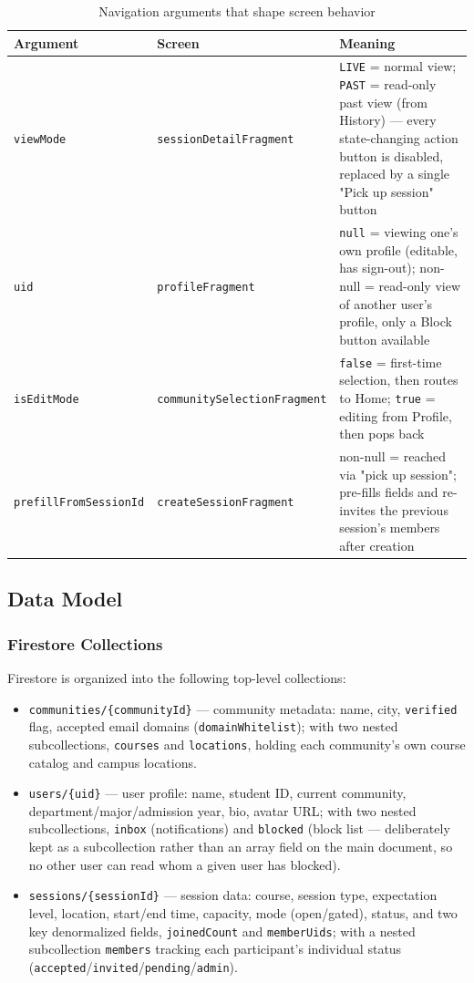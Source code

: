 \begin{table}[h]
\centering
\caption{Navigation arguments that shape screen behavior}
\label{tab:navargs}
\begin{tabular}{p{3.2cm}p{3.2cm}p{7cm}}
\toprule
\textbf{Argument} & \textbf{Screen} & \textbf{Meaning} \\
\midrule
\texttt{viewMode} & \texttt{sessionDetailFragment} & \texttt{LIVE} = normal view; \texttt{PAST} = read-only past view (from History) — every state-changing action button is disabled, replaced by a single "Pick up session" button \\
\texttt{uid} & \texttt{profileFragment} & \texttt{null} = viewing one's own profile (editable, has sign-out); non-null = read-only view of another user's profile, only a Block button available \\
\texttt{isEditMode} & \texttt{communitySelectionFragment} & \texttt{false} = first-time selection, then routes to Home; \texttt{true} = editing from Profile, then pops back \\
\texttt{prefillFromSessionId} & \texttt{createSessionFragment} & non-null = reached via "pick up session"; pre-fills fields and re-invites the previous session's members after creation \\
\bottomrule
\end{tabular}
\end{table}

\subsection{Data Model}
\label{sec:datamodel}

\subsubsection{Firestore Collections}

Firestore is organized into the following top-level collections:

\begin{itemize}
    \item \texttt{communities/\{communityId\}} — community metadata: name, city, \texttt{verified} flag, accepted email domains (\texttt{domainWhitelist}); with two nested subcollections, \texttt{courses} and \texttt{locations}, holding each community's own course catalog and campus locations.
    \item \texttt{users/\{uid\}} — user profile: name, student ID, current community, department/major/admission year, bio, avatar URL; with two nested subcollections, \texttt{inbox} (notifications) and \texttt{blocked} (block list — deliberately kept as a subcollection rather than an array field on the main document, so no other user can read whom a given user has blocked).
    \item \texttt{sessions/\{sessionId\}} — session data: course, session type, expectation level, location, start/end time, capacity, mode (open/gated), status, and two key denormalized fields, \texttt{joinedCount} and \texttt{memberUids}; with a nested subcollection \texttt{members} tracking each participant's individual status (\texttt{accepted}/\texttt{invited}/\texttt{pending}/\texttt{admin}).
\end{itemize}

